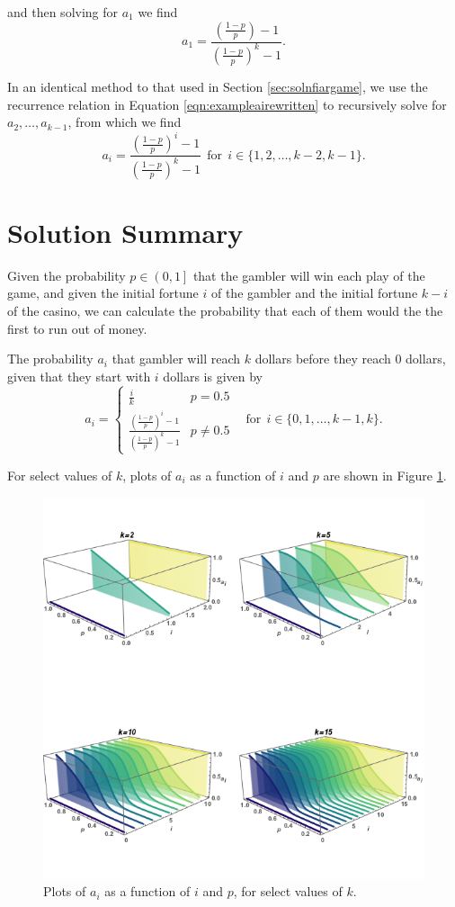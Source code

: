 \documentclass[a4paper,11pt]{article}
\begin{document}
and then solving for $a_1$ we find
\begin{equation}
a_1 = \frac{ \left(\frac{1-p}{p}\right) - 1 }{ \left(\frac{1-p}{p}\right)^k - 1 }.
\end{equation}

In an identical method to that used in Section \ref{sec:solnfiargame}, we use the recurrence relation in Equation \ref{eqn:exampleairewritten} to recursively solve for $a_2, \ldots, a_{k-1}$, from which we find
\begin{equation}
a_i = \frac{ \left(\frac{1-p}{p}\right)^i - 1 }{ \left(\frac{1-p}{p}\right)^k - 1 } \ \ \mathrm{for} \ \ i \in \{ 1, 2, \ldots, k-2, k-1 \}.
\end{equation}

\section{Solution Summary}

Given the probability $p\in\left(0,1\right]$ that the gambler will win each play of the game, and given the initial fortune $i$ of the gambler and the initial fortune $k-i$ of the casino, we can calculate the probability that each of them would the the first to run out of money.

The probability $a_i$ that gambler will reach $k$ dollars before they reach 0 dollars, given that they start with $i$ dollars is given by
\begin{equation}
a_i =
\begin{cases}
\frac{i}{k} & p=0.5\\
\frac{ \left(\frac{1-p}{p}\right)^i - 1 }{ \left(\frac{1-p}{p}\right)^k - 1 } & p\neq0.5
\end{cases} \ \ \ \ \mathrm{for} \ \ i \in \{ 0, 1, \ldots, k-1, k \}.
\end{equation}

For select values of $k$, plots of $a_i$ as a function of $i$ and $p$ are shown in Figure \ref{fig:ai_vs_i_p}.
\begin{figure}
\centering
\includegraphics[width=1\textwidth]{plots.png}
\caption{\label{fig:ai_vs_i_p}Plots of $a_i$ as a function of $i$ and $p$, for select values of $k$.}
\end{figure}
\end{document}

